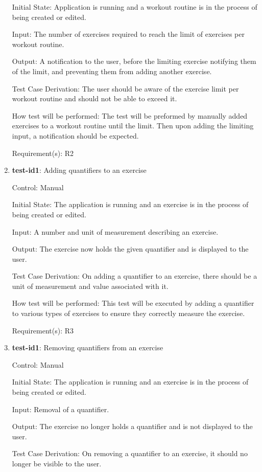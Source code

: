 \documentclass[12pt, titlepage]{article}
\begin{document}
\begin{enumerate}
		Initial State: Application is running and a workout routine is in the process of being created or edited.
		
		Input: The number of exercises required to reach the limit of exercises per workout routine. 
		
		Output: A notification to the user, before the limiting exercise notifying them of the limit, and preventing them from adding another exercise.
		
		Test Case Derivation: The user should be aware of the exercise limit per workout routine and should not be able to exceed it.
		
		How test will be performed: The test will be preformed by manually added exercises to a workout routine until the limit. Then upon adding the limiting input, a notification should be expected.
		
		Requirement(s): R2
		
		\item{\textbf{test-id1}}: Adding quantifiers to an exercise
		
		Control: Manual
		
		Initial State: The application is running and an exercise is in the process of being created or edited.
		
		Input: A number and unit of measurement describing an exercise.
		
		Output: The exercise now holds the given quantifier and is displayed to the user.
		
		Test Case Derivation: On adding a quantifier to an exercise, there should be a unit of measurement and value associated with it.
		
		How test will be performed: This test will be executed by adding a quantifier to various types of exercises to ensure they correctly measure the exercise.
		
		Requirement(s): R3
		
		\item{\textbf{test-id1}}: Removing quantifiers from an exercise
		
		Control: Manual
		
		Initial State: The application is running and an exercise is in the process of being created or edited.
		
		Input: Removal of a quantifier.
		
		Output: The exercise no longer holds a quantifier and is not displayed to the user.
		
		Test Case Derivation: On removing a quantifier to an exercise, it should no longer be visible to the user.
		

\end{enumerate}
\end{document}
